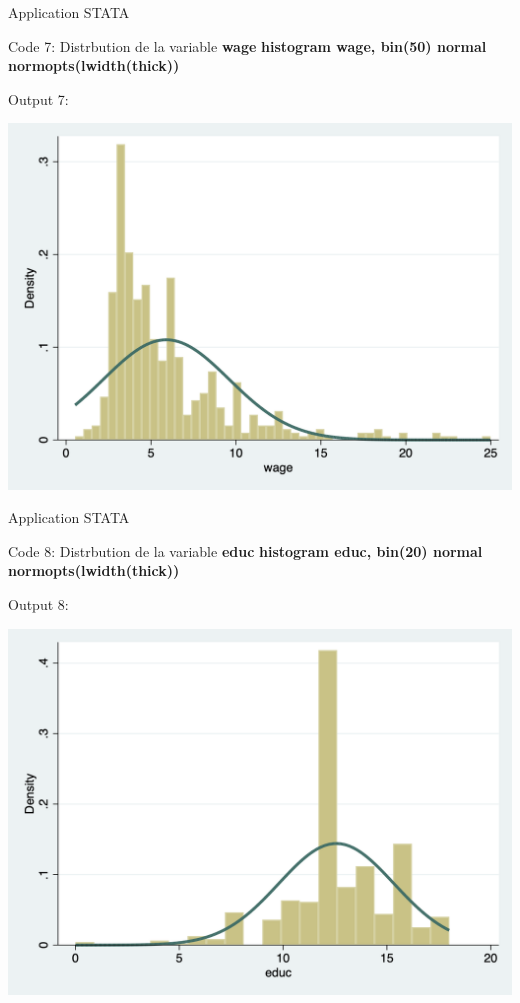 \documentclass{beamer}
\begin{document}
\begin{frame}{Application STATA}
\begin{block}{Code 7: Distrbution de la variable \textbf{wage}}
\textbf{histogram wage, bin(50) normal normopts(lwidth(thick))}
\end{block}

\begin{block}{Output 7:}
\begin{center}
\includegraphics[scale=.3]{PLOT_4.png}
\end{center}
\end{block}
\end{frame}

\begin{frame}{Application STATA}
\begin{block}{Code 8: Distrbution de la variable \textbf{educ}}
\textbf{histogram educ, bin(20) normal normopts(lwidth(thick))}
\end{block}

\begin{block}{Output 8:}
\begin{center}
\includegraphics[scale=.3]{PLOT_5.png}
\end{center}
\end{block}
\end{frame}
\end{document}
